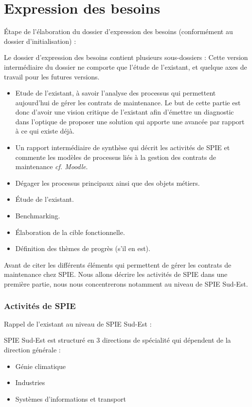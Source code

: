 \part{Expression des besoins}

Étape de l’élaboration du dossier d'expression des besoins (conformément au dossier d’initialisation) : 

Le dossier d’expression des besoins contient plusieurs sous-dossiers : Cette version intermédiaire du dossier ne comporte que l’étude de l’existant, et quelque axes de travail pour les futures versions.

\begin{itemize}
\item Etude de l’existant, à savoir l’analyse des processus qui permettent aujourd’hui de gérer les contrats de maintenance. Le but de cette partie est donc d’avoir une vision critique de l’existant afin d’émettre un diagnostic dans l’optique de proposer une solution qui apporte une avancée par rapport à  ce qui existe déjà.
\item Un rapport intermédiaire de synthèse qui décrit les activités de SPIE et commente les modèles de processus liés à la gestion des contrats de maintenance \textit{cf. Moodle}.
\item Dégager les processus principaux ainsi que des objets métiers.
\item Étude de l’existant.
\item Benchmarking.
\item Élaboration de la cible fonctionnelle.
\item Définition des thèmes de progrès (s’il en est).
\end{itemize}

Avant de citer les différents éléments qui permettent de gérer les contrats de maintenance chez SPIE. Nous allons décrire les activités de SPIE dans une première partie, nous nous concentrerons notamment au niveau de SPIE Sud-Est.

\section{Activités de SPIE}

Rappel de l’existant au niveau de SPIE Sud-Est :

SPIE Sud-Est est structuré en 3 directions de spécialité qui dépendent de la direction générale :

\begin{itemize}
\item Génie climatique
\item Industries
\item Systèmes d’informations et transport
\end{itemize}

